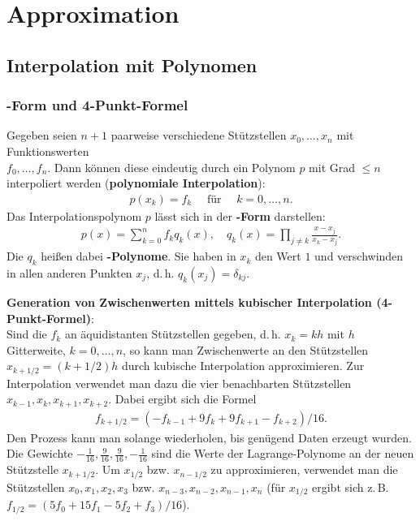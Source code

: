 \chapter{%
    Approximation%
}

\section{%
    Interpolation mit Polynomen%
}

\subsection{%
    -Form und 4-Punkt-Formel%
}

Gegeben seien $n + 1$ paarweise verschiedene Stützstellen $x_0, \dotsc, x_n$
mit Funktionswerten \\
$f_0, \dotsc, f_n$.
Dann können diese eindeutig durch ein Polynom $p$ mit Grad $\le n$ interpoliert
werden
(\textbf{polynomiale Interpolation}):
\begin{align*}
    p(x_k) = f_k \quad\text{ für }\quad k = 0, \dotsc, n.
\end{align*}
Das Interpolationspolynom $p$ lässt sich in der \textbf{-Form}
darstellen:
\begin{align*}
    p(x) = \sum_{k=0}^n f_k q_k(x), \quad
    q_k(x) = \prod_{j \not= k} \frac{x - x_j}{x_k - x_j}.
\end{align*}
Die $q_k$ heißen dabei \textbf{-Polynome}.
Sie haben in $x_k$ den Wert $1$ und verschwinden in allen anderen Punkten
$x_j$, d.\,h. $q_k(x_j) = \delta_{kj}$.

\linie

\textbf{Generation von Zwischenwerten mittels kubischer Interpolation
(4-Punkt-Formel)}: \\
Sind die $f_k$ an äquidistanten Stützstellen gegeben, d.\,h.
$x_k = kh$ mit $h$ Gitterweite, $k = 0, \dotsc, n$, so kann man
Zwischenwerte an den Stützstellen $x_{k + 1/2} = (k + 1/2)h$ durch kubische
Interpolation approximieren.
Zur Interpolation verwendet man dazu die vier benachbarten Stützstellen
$x_{k-1}, x_k, x_{k+1}, x_{k+2}$.
Dabei ergibt sich die Formel
\begin{align*}
    f_{k + 1/2} = (-f_{k-1} + 9f_k + 9f_{k+1} - f_{k+2}) / 16.
\end{align*}
Den Prozess kann man solange wiederholen, bis genügend Daten erzeugt wurden.
Die Gewichte $-\frac{1}{16}, \frac{9}{16}, \frac{9}{16}, -\frac{1}{16}$ sind
die Werte der Lagrange-Polynome an der neuen Stützstelle $x_{k + 1/2}$.
Um $x_{1/2}$ bzw. $x_{n - 1/2}$ zu approximieren, verwendet man die
Stützstellen $x_0, x_1, x_2, x_3$ bzw. $x_{n-3}, x_{n-2}, x_{n-1}, x_n$
(für $x_{1/2}$ ergibt sich z.\,B. $f_{1/2} = (5f_0 + 15f_1- 5f_2 + f_3) / 16$).

